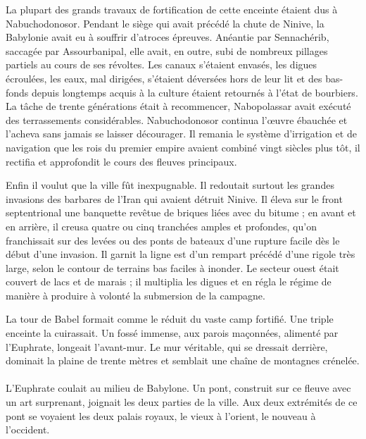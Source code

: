 \documentclass[a4paper, 11pt, oneside, polutonikogreek, french]{article}
\begin{document}
La plupart des grands travaux de fortification de cette enceinte étaient dus à Nabuchodonosor. Pendant le siège qui avait précédé la chute de Ninive, la Babylonie avait eu à souffrir d'atroces épreuves. Anéantie par Sennachérib, saccagée par Assourbanipal, elle avait, en outre, subi de nombreux pillages partiels au cours de ses révoltes. Les canaux s'étaient envasés, les digues écroulées, les eaux, mal dirigées, s'étaient déversées hors de leur lit et des bas-fonds depuis longtemps acquis à la culture étaient retournés à l'état de bourbiers. La tâche de trente générations était à recommencer, Nabopolassar avait exécuté des terrassements considérables. Nabuchodonosor continua l'œuvre ébauchée et l'acheva sans jamais se laisser décourager. Il remania le système d'irrigation et de navigation que les rois du premier empire avaient combiné vingt siècles plus tôt, il rectifia et approfondit le cours des fleuves principaux.

Enfin il voulut que la ville fût inexpugnable. Il redoutait surtout les grandes invasions des barbares de l'Iran qui avaient détruit Ninive. Il éleva sur le front septentrional une banquette revêtue de briques liées avec du bitume ; en avant et en arrière, il creusa quatre ou cinq tranchées amples et profondes, qu'on franchissait sur des levées ou des ponts de bateaux d'une rupture facile dès le début d'une invasion. Il garnit la ligne est d'un rempart précédé d'une rigole très large, selon le contour de terrains bas faciles à inonder. Le secteur ouest était couvert de lacs et de marais ; il multiplia les digues et en régla le régime de manière à produire à volonté la submersion de la campagne.

La tour de Babel formait comme le réduit du vaste camp fortifié. Une triple enceinte la cuirassait. Un fossé immense, aux parois maçonnées, alimenté par l'Euphrate, longeait l'avant-mur. Le mur véritable, qui se dressait derrière, dominait la plaine de trente mètres et semblait une chaîne de montagnes crénelée.
\clearpage
\paragraph{}
L'Euphrate coulait au milieu de Babylone. Un pont, construit sur ce fleuve avec un art surprenant, joignait les deux parties de la ville. Aux deux extrémités de ce pont se voyaient les deux palais royaux, le vieux à l'orient, le nouveau à l'occident.

\bigskip
\centerline{\EightStarTaper}
\centerline{\EightStarTaper\EightStarTaper}
\bigskip
\end{document}
